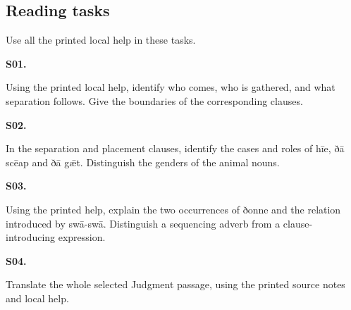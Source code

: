 \subsection*{Reading tasks}

Use all the printed local help in these tasks.

\par\begin{minipage}{\linewidth}\raggedright
\textbf{S01.}

Using the printed local help, identify who comes, who is gathered, and what separation follows. Give the boundaries of the corresponding clauses.

\end{minipage}\par\addvspace{4pt}

\par\begin{minipage}{\linewidth}\raggedright
\textbf{S02.}

In the separation and placement clauses, identify the cases and roles of hīe, ðā scēap and ðā gǣt. Distinguish the genders of the animal nouns.

\end{minipage}\par\addvspace{4pt}

\par\begin{minipage}{\linewidth}\raggedright
\textbf{S03.}

Using the printed help, explain the two occurrences of ðonne and the relation introduced by swā-swā. Distinguish a sequencing adverb from a clause-introducing expression.

\end{minipage}\par\addvspace{4pt}

\par\begin{minipage}{\linewidth}\raggedright
\textbf{S04.}

Translate the whole selected Judgment passage, using the printed source notes and local help.

\end{minipage}\par\addvspace{4pt}

